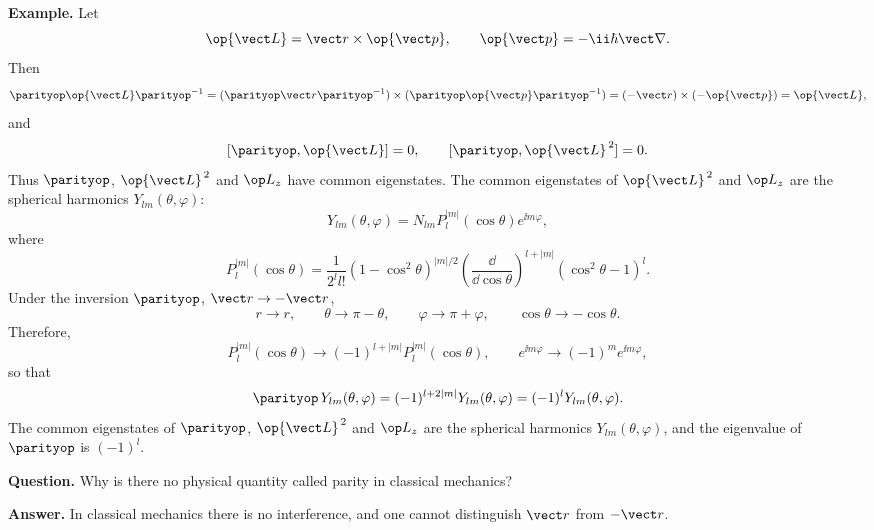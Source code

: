 \textbf{Example.} Let
\[\op{\vect L}=\vect r\times\op{\vect p},\qquad
\op{\vect p}=-\ii\hbar\vect\nabla.\]
Then
\[\parityop\op{\vect L}\parityop^{-1}
=(\parityop\vect r\parityop^{-1})\times(\parityop\op{\vect p}\parityop^{-1})
=(-\vect r)\times(-\op{\vect p})=\op{\vect L},\]
and
\[[\parityop,\op{\vect L}]=0,\qquad
[\parityop,\op{\vect L}^{\,2}]=0.\]
Thus $\parityop$, $\op{\vect L}^{\,2}$ and $\op L_z$ have common eigenstates. The common eigenstates of $\op{\vect L}^{\,2}$ and $\op L_z$ are the spherical harmonics $Y_{lm}(\theta,\varphi)$:
\[Y_{lm}(\theta,\varphi)=N_{lm}P_l^{|m|}(\cos\theta)e^{\ii m\varphi},\]
where
\[P_l^{|m|}(\cos\theta)=\frac1{2^l l!}
(1-\cos^2\theta)^{|m|/2}
\left(\frac{\dd}{\dd\cos\theta}\right)^{l+|m|}
(\cos^2\theta-1)^l.\]
Under the inversion $\parityop$, $\vect r\to-\vect r$,
\[r\to r,\qquad\theta\to\pi-\theta,\qquad
\varphi\to\pi+\varphi,\qquad
\cos\theta\to-\cos\theta.\]
Therefore,
\[P_l^{|m|}(\cos\theta)\to(-1)^{l+|m|}P_l^{|m|}(\cos\theta),
\qquad e^{\ii m\varphi}\to(-1)^m e^{\ii m\varphi},\]
so that
\[\parityop\,Y_{lm}(\theta,\varphi)
=(-1)^{l+2|m|}Y_{lm}(\theta,\varphi)=(-1)^lY_{lm}(\theta,\varphi).\]
The common eigenstates of $\parityop$, $\op{\vect L}^{\,2}$ and $\op L_z$ are the spherical harmonics $Y_{lm}(\theta,\varphi)$, and the eigenvalue of $\parityop$ is $(-1)^l$.

\textbf{Question.} Why is there no physical quantity called parity in classical mechanics?

\textbf{Answer.} In classical mechanics there is no interference, and one cannot distinguish $\vect r$ from $-\vect r$.